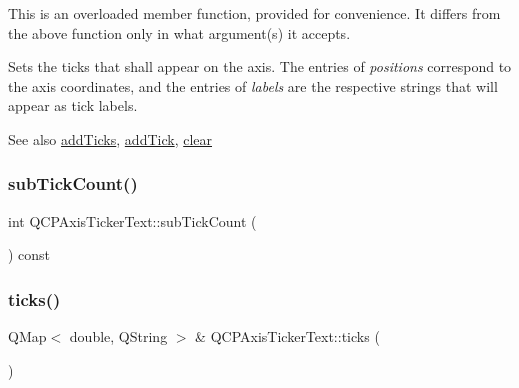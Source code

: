 This is an overloaded member function, provided for convenience. It differs from the above function only in what argument(s) it accepts.

Sets the ticks that shall appear on the axis. The entries of {\itshape positions} correspond to the axis coordinates, and the entries of {\itshape labels} are the respective strings that will appear as tick labels.

\begin{DoxySeeAlso}{See also}
\hyperlink{class_q_c_p_axis_ticker_text_aba34051300eecaefbedb2df8feff2d45}{add\+Ticks}, \hyperlink{class_q_c_p_axis_ticker_text_aada3db69e5fc6585aaa4ea5d89552eb0}{add\+Tick}, \hyperlink{class_q_c_p_axis_ticker_text_a21826d2fcd9a25c194d34d4f67aa1460}{clear} 
\end{DoxySeeAlso}
\mbox{\label{class_q_c_p_axis_ticker_text_a5c3c59e8fdf4c96568dd50d4a653e791}} 
\subsubsection{\texorpdfstring{sub\+Tick\+Count()}{subTickCount()}}
{\footnotesize\ttfamily int Q\+C\+P\+Axis\+Ticker\+Text\+::sub\+Tick\+Count (\begin{DoxyParamCaption}{ }\end{DoxyParamCaption}) const\hspace{0.3cm}{\ttfamily [inline]}}

\mbox{\label{class_q_c_p_axis_ticker_text_ac84622a6bb4f2a98474e185ecaf3189a}} 
\subsubsection{\texorpdfstring{ticks()}{ticks()}}
{\footnotesize\ttfamily Q\+Map$<$ double, Q\+String $>$ \& Q\+C\+P\+Axis\+Ticker\+Text\+::ticks (\begin{DoxyParamCaption}{ }\end{DoxyParamCaption})\hspace{0.3cm}{\ttfamily [inline]}}

